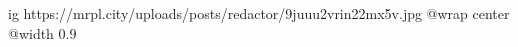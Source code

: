  
 
 
 
 

\ifcmt
  ig https://mrpl.city/uploads/posts/redactor/9juuu2vrin22mx5v.jpg
  @wrap center
  @width 0.9
\fi
